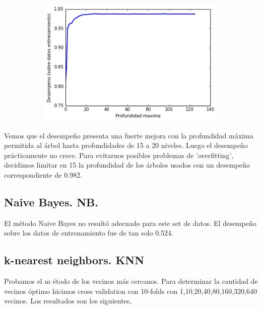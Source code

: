 \documentclass[a4paper,10pt]{article}
\begin{document}
  \begin{figure}[H]
    \centering
    \begin{subfigure}[b]{0.4\textwidth}
      \includegraphics[width=\textwidth]{../imagenes/desempeno-profundiad_arboles}
      \caption{}
    \end{subfigure}
    \label{fig:autovalores}
  \end{figure}


Vemos que el desempeño presenta una fuerte mejora con la profundidad máxima 
permitida al árbol hasta profundidades de 15 a 20 niveles. Luego el desempeño 
prácticamente no crece. Para evitarnos posibles problemas de 'overfitting', 
decidimos limitar en 15 la profundidad de los árboles usados con un desempeño 
correspondiente de 0.982.

\subsection{Naive Bayes. NB.}

El m\'etodo Naive Bayes no result\'o adecuado para este set de datos. El desempeño 
sobre los datos de entrenamiento fue de tan solo 0.524. 




\subsection{k-nearest neighbors. KNN}

Probamos el m \'etodo de los vecinos m\'as cercanos. Para determinar la cantidad de vecinos \'optimo hicimos cross validation con 10-folds con 1,10,20,40,80,160,320,640 vecinos. Los resultados son los siguientes, 
\end{document}
